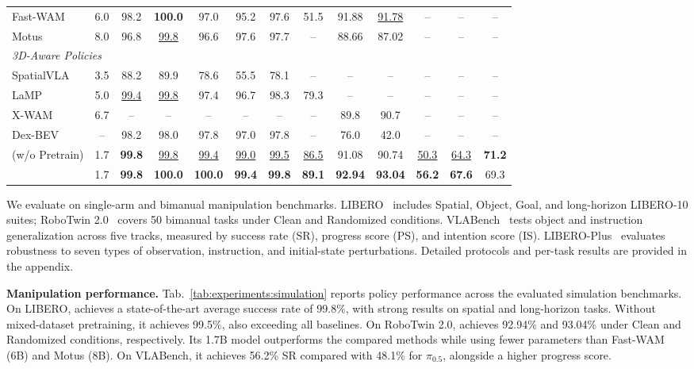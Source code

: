 \begin{table}[!b]
\begin{adjustbox}{max width=0.94\linewidth}
\begin{tabular}{@{}l*{12}{c}@{}}
        Fast-WAM & 6.0 & 98.2 & \textbf{100.0} & 97.0 & 95.2 & 97.6 & 51.5 & 91.88 & \underline{91.78} & -- & -- & -- \\
        Motus & 8.0 & 96.8 & \underline{99.8} & 96.6 & 97.6 & 97.7 & -- & 88.66 & 87.02 & -- & -- & -- \\
        \midrule
        \multicolumn{13}{l}{\textit{3D-Aware Policies}} \\
        SpatialVLA & 3.5 & 88.2 & 89.9 & 78.6 & 55.5 & 78.1 & -- & -- & -- & -- & -- & -- \\
        LaMP & 5.0 & \underline{99.4} & \underline{99.8} & 97.4 & 96.7 & 98.3 & 79.3 & -- & -- & -- & -- & -- \\
        X-WAM & 6.7 & -- & -- & -- & -- & -- & -- & 89.8 & 90.7 & -- & -- & -- \\
        Dex-BEV & -- & 98.2 & 98.0 & 97.8 & 97.0 & 97.8 & -- & 76.0 & 42.0 & -- & -- & -- \\
        \midrule
        \method{} (w/o Pretrain) & 1.7 & \textbf{99.8} & \underline{99.8} & \underline{99.4} & \underline{99.0} & \underline{99.5} & \underline{86.5} & 91.08 & 90.74 & \underline{50.3} & \underline{64.3} & \textbf{71.2} \\
        \method{} & 1.7 & \textbf{99.8} & \textbf{100.0} & \textbf{100.0} & \textbf{99.4} & \textbf{99.8} & \textbf{89.1} & \textbf{92.94} & \textbf{93.04} & \textbf{56.2} & \textbf{67.6} & 69.3 \\
        \bottomrule
    \end{tabular}
    \end{adjustbox}
    \vspace{-0.15cm}
\end{table}

We evaluate \method{} on single-arm and bimanual manipulation benchmarks.
LIBERO~\citep{liu2023libero} includes Spatial, Object, Goal, and
long-horizon LIBERO-10 suites; RoboTwin 2.0~\citep{chen2025robotwin}
covers 50 bimanual tasks under Clean and Randomized conditions.
VLABench~\citep{zhang2024vlabench} tests object and instruction
generalization across five tracks, measured by success rate (SR),
progress score (PS), and intention score (IS).
LIBERO-Plus~\citep{fei2025liberoplus} evaluates robustness to seven
types of observation, instruction, and initial-state perturbations.
Detailed protocols and per-task results are provided in the appendix.



\noindent\textbf{Manipulation performance.}
Tab.~\ref{tab:experiments:simulation} reports policy performance across
the evaluated simulation benchmarks. On LIBERO, \method{} achieves a
state-of-the-art average success rate of 99.8\%, with strong results
on spatial and long-horizon tasks. Without mixed-dataset pretraining,
it achieves 99.5\%, also exceeding all baselines.
On RoboTwin 2.0, \method{} achieves 92.94\% and 93.04\% under Clean
and Randomized conditions, respectively. Its 1.7B model outperforms
the compared methods while using fewer parameters than Fast-WAM (6B)
and Motus (8B). On VLABench, it achieves 56.2\% SR compared with
48.1\% for $\pi_{0.5}$, alongside a higher progress score.

